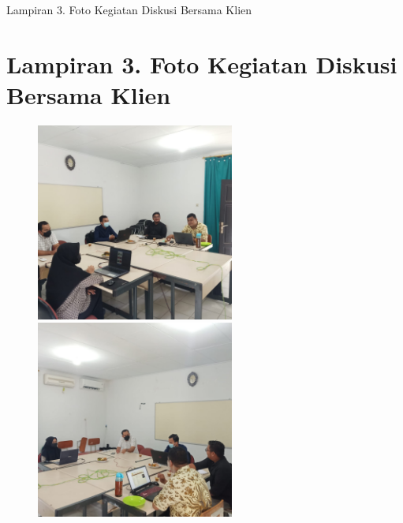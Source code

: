\begin{appendices}{Lampiran 3. Foto Kegiatan Diskusi Bersama Klien}
    \section*{Lampiran 3. Foto Kegiatan Diskusi Bersama Klien}
    \begin{figure}[H]
            \includegraphics[width=6.5cm,height=6.5cm]{gambar/dokumentasi/diskusi1}
            \hspace*{0.3cm}
            \includegraphics[width=6.5cm,height=6.5cm]{gambar/dokumentasi/diskusi2}
    \end{figure}
\end{appendices}

